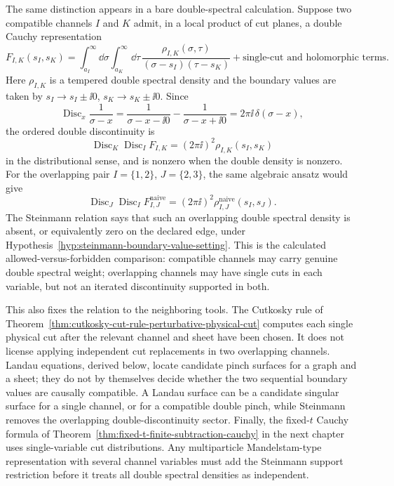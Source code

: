 The same distinction appears in a bare double-spectral calculation.  Suppose
two compatible channels \(I\) and \(K\) admit, in a local product of cut
planes, a double Cauchy representation
\begin{equation}
  F_{I,K}(s_I,s_K)
  =
  \int_{a_I}^{\infty}\!\dd\sigma
  \int_{a_K}^{\infty}\!\dd\tau\,
  \frac{\rho_{I,K}(\sigma,\tau)}
       {(\sigma-s_I)(\tau-s_K)}
  +\text{single-cut and holomorphic terms}.
  \label{eq:steinmann-double-spectral-compatible}
\end{equation}
Here \(\rho_{I,K}\) is a tempered double spectral density and the boundary
values are taken by \(s_I\to s_I\pm\ii0\),
\(s_K\to s_K\pm\ii0\).  Since
\[
  \operatorname{Disc}_{x}\frac1{\sigma-x}
  =
  \frac1{\sigma-x-\ii0}-\frac1{\sigma-x+\ii0}
  =
  2\pi\ii\,\delta(\sigma-x),
\]
the ordered double discontinuity is
\begin{equation}
  \operatorname{Disc}_K\operatorname{Disc}_I F_{I,K}
  =
  (2\pi\ii)^2\rho_{I,K}(s_I,s_K)
  \label{eq:steinmann-compatible-double-disc}
\end{equation}
in the distributional sense, and is nonzero when the double density is nonzero.
For the overlapping pair \(I=\{1,2\}\), \(J=\{2,3\}\), the same algebraic ansatz
would give
\begin{equation}
  \operatorname{Disc}_J\operatorname{Disc}_I F_{I,J}^{\mathrm{naive}}
  =
  (2\pi\ii)^2\rho_{I,J}^{\mathrm{naive}}(s_I,s_J).
  \label{eq:steinmann-overlap-naive-density}
\end{equation}
The Steinmann relation says that such an overlapping double spectral density
is absent, or equivalently zero on the declared edge, under
Hypothesis~\ref{hyp:steinmann-boundary-value-setting}.  This is the calculated
allowed-versus-forbidden comparison: compatible channels may carry genuine
double spectral weight; overlapping channels may have single cuts in each
variable, but not an iterated discontinuity supported in both.

This also fixes the relation to the neighboring tools.  The Cutkosky rule of
Theorem~\ref{thm:cutkosky-cut-rule-perturbative-physical-cut} computes each
single physical cut after the relevant channel and sheet have been chosen.  It
does not license applying independent cut replacements in two overlapping
channels.  Landau equations, derived below, locate candidate pinch surfaces for
a graph and a sheet; they do not by themselves decide whether the two
sequential boundary values are causally compatible.  A Landau surface can be a
candidate singular surface for a single channel, or for a compatible double
pinch, while Steinmann removes the overlapping double-discontinuity sector.
Finally, the fixed-\(t\) Cauchy formula of
Theorem~\ref{thm:fixed-t-finite-subtraction-cauchy} in the next chapter uses
single-variable cut distributions.  Any multiparticle Mandelstam-type
representation with several channel variables must add the Steinmann support
restriction before it treats all double spectral densities as independent.

